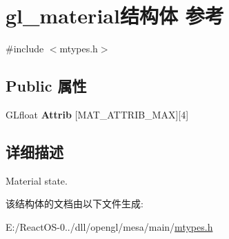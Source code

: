 \hypertarget{structgl__material}{}\section{gl\+\_\+material结构体 参考}
\label{structgl__material}


{\ttfamily \#include $<$mtypes.\+h$>$}

\subsection*{Public 属性}
\begin{DoxyCompactItemize}
\item 
\mbox{\label{structgl__material_afaa2b8f97d61ecddb7284e45572d420d}} 
G\+Lfloat {\bfseries Attrib} \mbox{[}M\+A\+T\+\_\+\+A\+T\+T\+R\+I\+B\+\_\+\+M\+AX\mbox{]}\mbox{[}4\mbox{]}
\end{DoxyCompactItemize}


\subsection{详细描述}
Material state. 

该结构体的文档由以下文件生成\+:\begin{DoxyCompactItemize}
\item 
E\+:/\+React\+O\+S-\/0../dll/opengl/mesa/main/\hyperlink{mtypes_8h}{mtypes.\+h}\end{DoxyCompactItemize}
